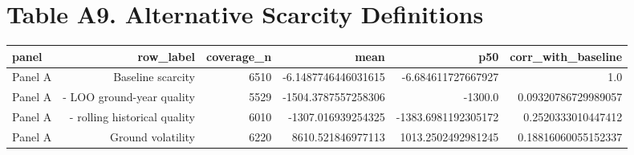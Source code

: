 \documentclass{article}
\begin{document}
\section*{Table A9. Alternative Scarcity Definitions}
\begin{tabular}{lrrrrr}
\hline
panel & row_label & coverage_n & mean & p50 & corr_with_baseline \\
\hline
Panel A & Baseline scarcity & 6510 & -6.1487746446031615 & -6.684611727667927 & 1.0 \\
Panel A & - LOO ground-year quality & 5529 & -1504.3787557258306 & -1300.0 & 0.09320786729989057 \\
Panel A & - rolling historical quality & 6010 & -1307.016939254325 & -1383.6981192305172 & 0.2520333010447412 \\
Panel A & Ground volatility & 6220 & 8610.521846977113 & 1013.2502492981245 & 0.18816060055152337 \\
\hline
\end{tabular}
\end{document}
